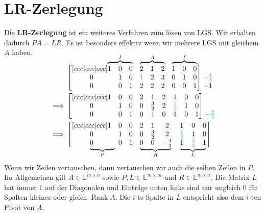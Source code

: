 \documentclass[a4paper,10pt]{article}
\DeclareMathOperator{\Rank}{Rank}
\newcommand\undermat[2]{%
  \makebox[0pt][l]{$\smash{\underbrace{\phantom{%
    \begin{matrix}#2\end{matrix}}}_{\text{$#1$}}}$}#2}
\newcommand\overmat[2]{%
  \makebox[0pt][l]{$\smash{\overbrace{\phantom{%
    \begin{matrix}#2\end{matrix}}}^{\text{$#1$}}}$}#2}
\def\E{\mathbb{E}}
\begin{document}
\section{LR-Zerlegung}

Die \textbf{LR-Zerlegung} ist ein weiteres Verfahren zum lösen von LGS. Wir erhalten dadurch $PA = LR$. Es ist besonders effektiv wenn wir mehrere LGS mit gleichem $A$ haben.

\begin{align*}
  & \begin{bmatrix}[ccc|ccc|ccc]
    \overmat{I}{1 & 0 & 0} & \overmat{A}{2 & 1 & 2} & \overmat{I}{1 & 0 & 0}\\
    0 & 1 & 0 & \textcolor{green}{1} & 2 & 3 & 0 & 1 & 0\\
    0 & 0 & 1 & \textcolor{blue}{2} & 2 & 2 & 0 & 0 & 1
  \end{bmatrix} \begin{matrix}
    \\
    \textcolor{green}{-\frac{1}{2}}\\
    \textcolor{blue}{-1}
  \end{matrix}\\
  \implies & \begin{bmatrix}[ccc|ccc|ccc]
    1 & 0 & 0 & 2 & 1 & 2 & 1 & 0 & 0\\
    0 & 1 & 0 & 0 & \frac{3}{2} & 2 & \textcolor{green}{\frac{1}{2}} & 1 & 0\\
    0 & 0 & 1 & 0 & \textcolor{cyan}{1} & 0 & \textcolor{blue}{1} & 0 & 1
  \end{bmatrix} \begin{matrix}
    \\
    \\
    \textcolor{cyan}{-\frac{2}{3}}
  \end{matrix}\\
  \implies & \begin{bmatrix}[ccc|ccc|ccc]
    1 & 0 & 0 & 2 & 1 & 2 & 1 & 0 & 0\\
    0 & 1 & 0 & 0 & \frac{3}{2} & 2 & \textcolor{green}{\frac{1}{2}} & 1 & 0\\
    \undermat{P}{0 & 0 & 1} & \undermat{R}{0 & 0 & -\frac{4}{3}} & \undermat{L}{\textcolor{blue}{1} & \textcolor{cyan}{\frac{2}{3}} & 1}
  \end{bmatrix}
\end{align*}\\

Wenn wir Zeilen vertauschen, dann vertauschen wir auch die selben Zeilen in $P$. Im Allgemeinen gilt $A \in \E^{m \times n}$ sowie $P, L \in \E^{m \times m}$ und $R \in \E^{m \times n}$. Die Matrix $L$ hat immer $1$ auf der Diagonalen und Einträge unten links sind nur ungleich $0$ für Spalten kleiner oder gleich $\Rank A$. Die $i$-te Spalte in $L$ entspricht also dem $i$-ten Pivot von $A$.
\end{document}
